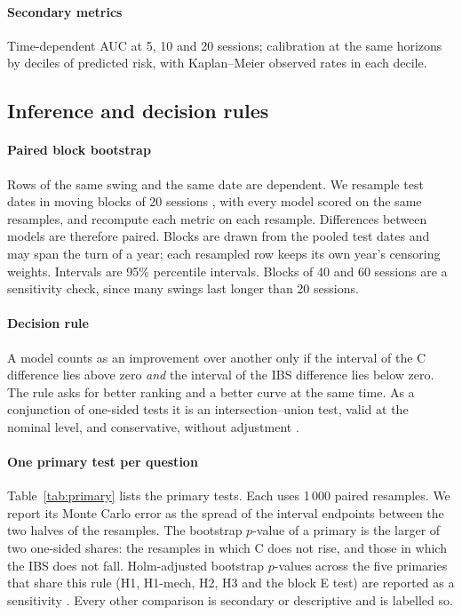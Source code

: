 \paragraph{Secondary metrics} Time-dependent AUC at 5, 10 and 20 sessions; calibration at the
same horizons by deciles of predicted risk, with Kaplan--Meier observed rates in each decile.

\subsection{Inference and decision rules}\label{sec:inference}

\paragraph{Paired block bootstrap} Rows of the same swing and the same date are dependent. We
resample test dates in moving blocks of 20 sessions \citep{Kunsch1989}, with every model scored on
the same resamples, and recompute each metric on each resample. Differences between models are
therefore paired. Blocks are drawn from the pooled test dates and may span the turn of a year;
each resampled row keeps its own year's censoring weights. Intervals are 95\% percentile intervals. Blocks of 40 and 60 sessions are a
sensitivity check, since many swings last longer than 20 sessions.

\paragraph{Decision rule} A model counts as an improvement over another only if the interval of the
C difference lies above zero \emph{and} the interval of the IBS difference lies below zero. The
rule asks for better ranking and a better curve at the same time. As a conjunction of one-sided
tests it is an intersection--union test, valid at the nominal level, and conservative, without adjustment
\citep{Berger1982}.

\paragraph{One primary test per question} Table~\ref{tab:primary} lists the primary tests. Each
uses 1\,000 paired resamples. We report its Monte Carlo error as the spread of the interval endpoints
between the two halves of the resamples. The bootstrap $p$-value of a primary is the larger of
two one-sided shares: the resamples in which C does not rise, and those in which the IBS does not
fall. Holm-adjusted bootstrap $p$-values across the five
primaries that share this rule (H1, H1-mech, H2, H3 and the block E test) are reported as a
sensitivity \citep{Holm1979}. Every
other comparison is secondary or descriptive and is labelled so.

